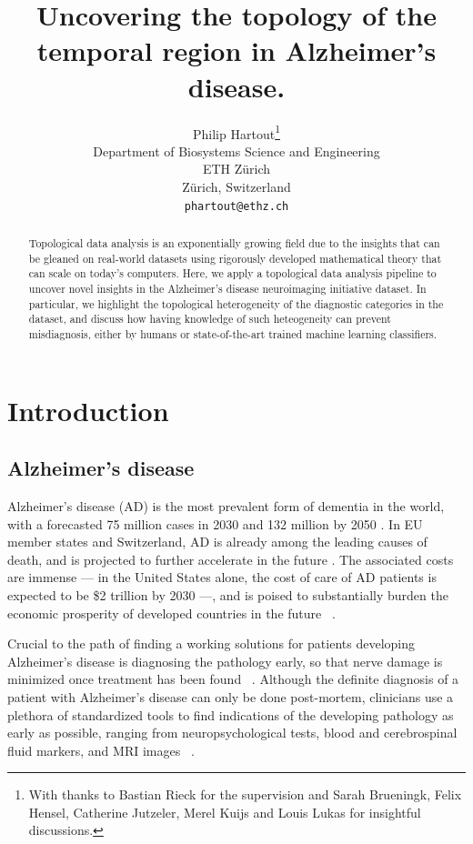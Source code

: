 \documentclass{article}
\title{Uncovering the topology of the temporal region in Alzheimer's disease.}
\author{%
  Philip Hartout\thanks{With thanks to Bastian Rieck for the supervision and Sarah Brueningk, Felix Hensel, Catherine Jutzeler, Merel Kuijs and Louis Lukas for insightful discussions.}\\
  Department of Biosystems Science and Engineering\\
  ETH Zürich\\
  Zürich, Switzerland \\
  \texttt{phartout@ethz.ch} \\
}
\begin{document}
\maketitle

\begin{abstract}
Topological data analysis is an exponentially growing field due to the insights that can be gleaned on real-world datasets using rigorously developed mathematical theory that can scale on today's computers. Here, we apply a topological data analysis pipeline to uncover novel insights in the Alzheimer's disease neuroimaging initiative dataset. In particular, we highlight the topological heterogeneity of the diagnostic categories in the dataset, and discuss how having knowledge of such heteogeneity can prevent misdiagnosis, either by humans or state-of-the-art trained machine learning classifiers.
\end{abstract}

\section{Introduction}

\subsection{Alzheimer's disease}\label{sec:ad_context}

Alzheimer's disease (AD) is the most prevalent form of dementia in the world, with a forecasted 75 million cases in 2030 and 132 million by 2050 \citep{world2017global}. In EU member states and Switzerland, AD is already among the leading causes of death, and is projected to further accelerate in the future \citep{sleeman2019escalating}. The associated costs are immense --- in the United States alone, the cost of care of AD patients is expected to be \$2 trillion by 2030 ---, and is poised to substantially burden the economic prosperity of developed countries in the future ~\citep{world2017global}.

Crucial to the path of finding a working solutions for patients developing Alzheimer's disease is diagnosing the pathology early, so that nerve damage is minimized once treatment has been found ~\citep{yiannopoulou2020current}. Although the definite diagnosis of a patient with Alzheimer's disease can only be done post-mortem, clinicians use a plethora of standardized tools to find indications of the developing pathology as early as possible, ranging from neuropsychological tests, blood and cerebrospinal fluid markers, and MRI images ~\citep{mckhann2011diagnosis, lehmann2016biomarkers, smits2012early}.
\end{document}
